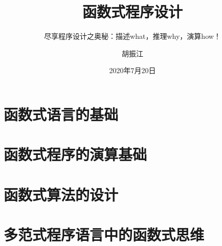 \documentclass[cn,11pt]{elegantbook}
\title{函数式程序设计}
\subtitle{尽享程序设计之奥秘：描述what，推理why，演算how！}
\author{胡振江}
\institute{北京大学}
\date{2020年7月20日}
\begin{document}
\maketitle
\frontmatter

\tableofcontents

\mainmatter

\part{函数式语言的基础}









\part{函数式程序的演算基础}







\part{函数式算法的设计}





\part{多范式程序语言中的函数式思维}






%
\nocite{*}
\printbibliography
\appendix
\end{document}
